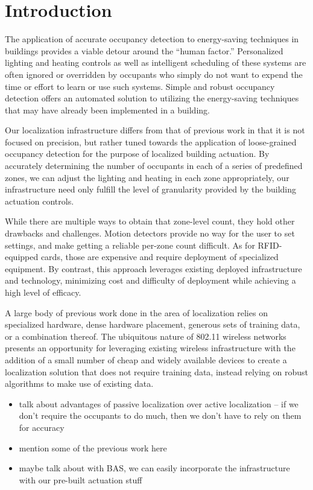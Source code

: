 \section{Introduction}
The application of accurate occupancy detection to energy-saving techniques in buildings provides a viable detour around the ``human factor.'' Personalized lighting and heating controls as well as intelligent scheduling of these systems are often ignored or overridden by occupants who simply do not want to expend the time or effort to learn or use such systems. Simple and robust occupancy detection offers an automated solution to utilizing the energy-saving techniques that may have already been implemented in a building.

Our localization infrastructure differs from that of previous work in that it is not focused on precision, but rather tuned towards the application of loose-grained occupancy detection for the purpose of localized building actuation. By accurately determining the number of occupants in each of a series of predefined zones, we can adjust the lighting and heating in each zone appropriately, our infrastructure need only fulfill the level of granularity provided by the building actuation controls.

While there are multiple ways to obtain that zone-level count, they hold other drawbacks and challenges.  Motion detectors provide no way for the user to set settings, and make getting a reliable per-zone count difficult.  As for RFID-equipped cards, those are expensive and require deployment of specialized equipment.  By contrast, this approach leverages existing deployed infrastructure and technology, minimizing cost and difficulty of deployment while achieving a high level of efficacy.

A large body of previous work done in the area of localization relies on specialized hardware, dense hardware placement, generous sets of training data, or a combination thereof. The ubiquitous nature of 802.11 wireless networks presents an opportunity for leveraging existing wireless infrastructure with the addition of a small number of cheap and widely available devices to create a localization solution that does not require training data, instead relying on robust algorithms to make use of existing data.

\begin{itemize}
\item talk about advantages of passive localization over active localization -- if we don't require the occupants to do much, then we don't have to rely on them for accuracy
\item mention some of the previous work here
\item maybe talk about with BAS, we can easily incorporate the infrastructure with our pre-built actuation stuff
\end{itemize}
